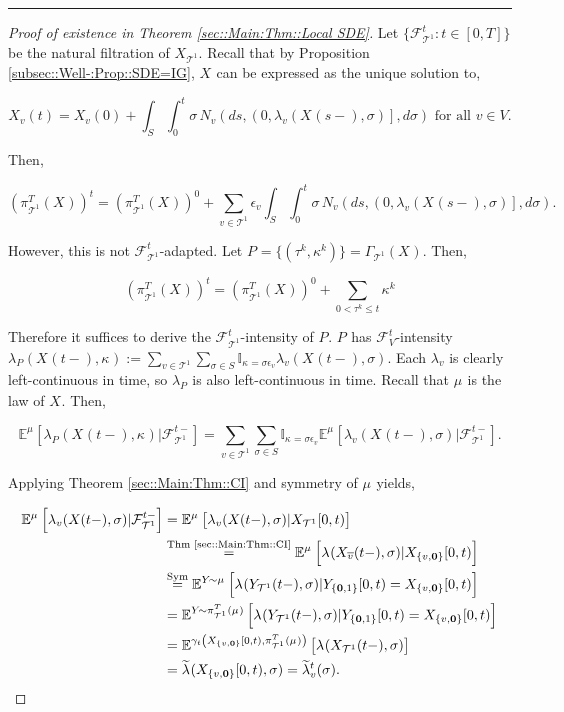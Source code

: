 \documentclass[12pt]{article}
\newcommand{\mb}{\mathbb}
\newcommand{\mc}{\mathcal}
\newcommand{\ov}{\overline}
\newcommand{\os}{\overset}
\newcommand{\te}{\text}
\newcommand{\ep}{\epsilon}
\newcommand{\lin}{\rule{\linewidth}{0.4 pt}}
\newcommand{\exmu}[2]{\mb{E}^{#1}\left[#2\right]}	%
\renewcommand{\root}{\mathbf{0}}				%
\renewcommand{\v}{v}							%
\newcommand{\cl}{\ov}							%
\renewcommand{\S}{S}							%
\newcommand{\s}{\sigma}							%
\newcommand{\ev}[1]{\ep_{#1}}					%
\newcommand{\T}{T}								%
\renewcommand{\t}{t}							%
\newcommand{\poiss}[1]{N_{#1}}						%
\newcommand{\pup}[1]{^{#1}}							%
\newcommand{\tree}{\mc{T}}							%
\newcommand{\V}{V}									%
\renewcommand{\tt}{s}								%
\newcommand{\rt}[1]{\tau^{#1}}						%
\renewcommand{\it}{k}								%
\newcommand{\piV}[2]{\pi_{#1}^{#2}}					%
\newcommand{\rxvt}[2]{X_{#1}{(#2)}}					%
\newcommand{\rxvtt}[2]{Y_{#1}{(#2)}}				%
\newcommand{\rxvts}[2]{X_{#1}{#2}}					%
\newcommand{\rxvtts}[2]{Y_{#1}{#2}}					%
\newcommand{\rp}[1]{P^{#1}}							%
\newcommand{\m}[3]{\mu_{#2#1}^{#3}}						%
\newcommand{\cm}{\gamma}							%
\newcommand{\rate}[1]{\lambda_{#1}}					%
\newcommand{\crate}[2]{\alt{\lambda}_{#1}^{#2}}		%
\newcommand{\F}[2]{\mc{F}_{#1}^{#2}}				%
\newcommand{\alt}{\widetilde}						%
\renewcommand{\mark}[1]{\kappa^{#1}}				%
\newcommand{\pmap}[1]{\Gamma_{#1}}				%
\begin{document}
\lin

\begin{proof}[Proof of existence in Theorem \ref{sec::Main:Thm::Local SDE}]

Let \(\{\F{\tree\pup{1}}{\t}:\t\in [0,\T]\}\) be the natural filtration of \(\rxvts{\tree\pup{1}}{}\). Recall that by Proposition \ref{subsec::Well-:Prop::SDE=IG}, \(\rxvts{}{}\) can be expressed as the unique solution to,

\[\rxvt{\v}{\t} = \rxvt{\v}{0} + \int_\S\int_0^\t \s\,\poiss{\v}\left(d\tt,\left(0,\rate{\v}(\rxvt{}{\tt-},\s)\right],d\s\right) \te{ for all } \v \in \V.\]

Then,

\[\left(\piV{\tree\pup{1}}{\T}(\rxvts{}{})\right)^\t = \left(\piV{\tree\pup{1}}{\T}(\rxvts{}{})\right)^0 + \sum_{\v \in \tree\pup{1}}\ev{\v}\int_\S\int_0^\t \s\,\poiss{\v}\left(d\tt,\left(0,\rate{\v}(\rxvt{}{\tt-},\s)\right],d\s\right).\]

However, this is not \(\F{\tree\pup{1}}{\t}\)-adapted. Let \(\rp{} = \{(\rt{\it},\mark{\it})\} = \pmap{\tree\pup{1}}(\rxvts{}{}).\) Then,

\[\left(\piV{\tree\pup{1}}{\T}(\rxvts{}{})\right)^\t = \left(\piV{\tree\pup{1}}{\T}(\rxvts{}{})\right)^0 + \sum_{0 < \rt{\it} \leq t}\mark{\it}\]

Therefore it suffices to derive the \(\F{\tree\pup{1}}{\t}\)-intensity of \(\rp{}\). \(\rp{}\) has \(\F{\V}{\t}\)-intensity \(\rate{\rp{}}(\rxvt{}{\t-},\mark{}) := \sum_{\v \in \tree^1}\sum_{\s\in S}\mb{I}_{\mark{} = \s\ev{\v}}\rate{\v}(\rxvt{}{\t-},\s)\). Each \(\rate{\v}\) is clearly left-continuous in time, so \(\rate{\rp{}}\) is also left-continuous in time. Recall that \(\m{}{}{}\) is the law of \(\rxvts{}{}\). Then,

\[\exmu{\m{}{}{}}{\rate{\rp{}}(\rxvt{}{\t-},\mark{})|\F{\tree\pup{1}}{\t-}} = \sum_{\v \in \tree\pup{1}}\sum_{\s\in S} \mb{I}_{\mark{} = \s\ev{\v}}\exmu{\m{}{}{}}{\rate{\v}(\rxvt{}{\t-},\s)|\F{\tree\pup{1}}{\t-}}.\]

Applying Theorem \ref{sec::Main:Thm::CI} and symmetry of \(\m{}{}{}\) yields,

\begin{align*}
\exmu{\m{}{}{}}{\rate{\v}(\rxvt{}{\t-},\s)|\F{\tree\pup{1}}{\t-}} &= \exmu{\m{}{}{}}{\rate{\v}(\rxvt{}{\t-},\s)|\rxvts{\tree\pup{1}}{[0,\t)}}\\
&\os{\te{Thm \ref{sec::Main:Thm::CI}}}{=} \exmu{\m{}{}{}}{\rate{}(\rxvt{\cl{\v}}{\t-},\s)|\rxvts{\{\v,\root\}}{[0,\t)}} \\
&\os{\te{Sym}}{=} \exmu{\rxvtts{}{}\sim \m{}{}{}}{\rate{}(\rxvtt{\tree\pup{1}}{\t-},\s)|\rxvtts{\{\root,1\}}{[0,\t)} = \rxvts{\{\v,\root\}}{[0,\t)}}\\
&= \exmu{\rxvtts{}{}\sim \piV{\tree\pup{1}}{\T}(\m{}{}{})}{\rate{}(\rxvtt{\tree\pup{1}}{\t-},\s)|\rxvtts{\{\root,1\}}{[0,\t)} = \rxvts{\{\v,\root\}}{[0,\t)}}\\
&= \exmu{\cm_\t\left(\rxvts{\{\v,\root\}}{[0,\t)},\piV{\tree\pup{1}}{\T}(\m{}{}{})\right)}{\rate{}(\rxvt{\tree\pup{1}}{\t-},\s)}\\
&=\crate{}{}(\rxvts{\{\v,\root\}}{[0,\t)},\s) = \crate{\v}{\t}(\s).
\end{align*}


\end{proof}
\end{document}
